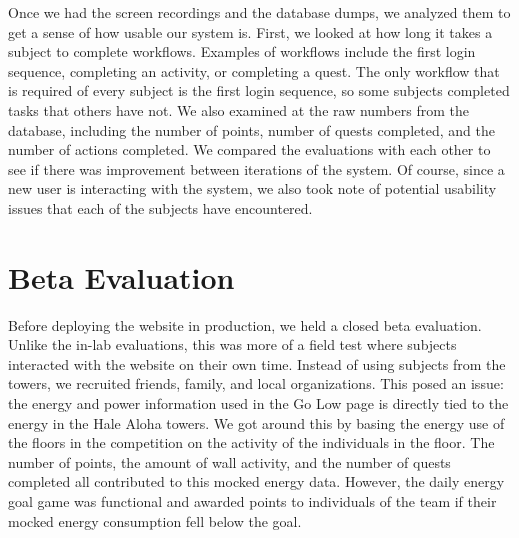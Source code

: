 Once we had the screen recordings and the database dumps, we analyzed them to get a sense of how usable our system is. First, we looked at how long it takes a subject to complete workflows. Examples of workflows include the first login sequence, completing an activity, or completing a quest. The only workflow that is required of every subject is the first login sequence, so some subjects completed tasks that others have not. We also examined at the raw numbers from the database, including the number of points, number of quests completed, and the number of actions completed. We compared the evaluations with each other to see if there was improvement between iterations of the system. Of course, since a new user is interacting with the system, we also took note of potential usability issues that each of the subjects have encountered. 

% 

\section{Beta Evaluation}

Before deploying the website in production, we held a closed beta evaluation. Unlike the in-lab evaluations, this was more of a field test where subjects interacted with the website on their own time. Instead of using subjects from the towers, we recruited friends, family, and local organizations. This posed an issue: the energy and power information used in the Go Low page is directly tied to the energy in the Hale Aloha towers. We got around this by basing the energy use of the floors in the competition on the activity of the individuals in the floor. The number of points, the amount of wall activity, and the number of quests completed all contributed to this mocked energy data. However, the daily energy goal game was functional and awarded points to individuals of the team if their mocked energy consumption fell below the goal.

